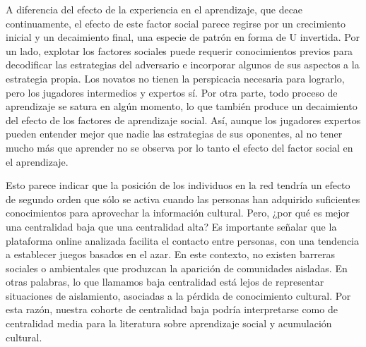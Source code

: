 \documentclass[a4paper,11pt]{book}
\theoremstyle{definition}
\begin{document}
A diferencia del efecto de la experiencia en el aprendizaje, que decae continuamente, el efecto de este factor social parece regirse por un crecimiento inicial y un decaimiento final, una especie de patr\'on en forma de U invertida.
%
Por un lado, explotar los factores sociales puede requerir conocimientos previos para decodificar las estrategias del adversario e incorporar algunos de sus aspectos a la estrategia propia.
%
Los novatos no tienen la perspicacia necesaria para lograrlo, pero los jugadores intermedios y expertos s\'i.
%
Por otra parte, todo proceso de aprendizaje se satura en alg\'un momento, lo que tambi\'en produce un decaimiento del efecto de los factores de aprendizaje social.
%
As\'i, aunque los jugadores expertos pueden entender mejor que nadie las estrategias de sus oponentes, al no tener mucho m\'as que aprender no se observa por lo tanto el efecto del factor social en el aprendizaje.


Esto parece indicar que la posici\'on de los individuos en la red tendr\'ia un efecto de segundo orden que s\'olo se activa cuando las personas han adquirido suficientes conocimientos para aprovechar la informaci\'on cultural.
%
Pero, ¿por qu\'e es mejor una centralidad baja que una centralidad alta?
%
Es importante se\~nalar que la plataforma online analizada facilita el contacto entre personas, con una tendencia a establecer juegos basados en el azar.
%
En este contexto, no existen barreras sociales o ambientales que produzcan la aparici\'on de comunidades aisladas.
%
En otras palabras, lo que llamamos baja centralidad est\'a lejos de representar situaciones de aislamiento, asociadas a la p\'erdida de conocimiento cultural.
%
Por esta raz\'on, nuestra cohorte de centralidad baja podr\'ia interpretarse como de centralidad media para la literatura sobre aprendizaje social y acumulaci\'on cultural.

\end{document}
